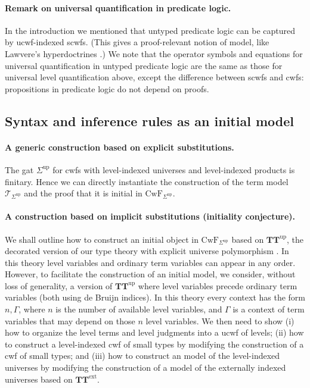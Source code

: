 \documentclass[11pt,a4paper]{article}
\theoremstyle{plain}
\theoremstyle{definition}
\newcommand{\T}{\mathsf{T}}
\def\T{\mathcal{T}}
\def\CwF{\mathrm{CwF}}
\def\Sigmaint{{\Sigma^\mathrm{up}}}
\def\TText{{\mathbf{TT}^\mathrm{ext}}}
\def\TTint{{\mathbf{TT}^\mathrm{up}}}
\begin{document}
\paragraph{Remark on universal quantification in predicate logic.} 

In the introduction we mentioned that untyped predicate logic can be captured by ucwf-indexed scwfs. (This gives a proof-relevant notion of model, like Lawvere's hyperdoctrines \cite{lawvere:hyperdoctrines}.) We note that the operator symbols and equations for universal quantification in untyped predicate logic are the same as those for universal level quantification above, except the difference between scwfs and cwfs: propositions in predicate logic do not depend on proofs.

\subsection{Syntax and inference rules as an initial model}\label{initiality-internal}

\paragraph{A generic construction based on explicit substitutions.} The gat $\Sigmaint$ for cwfs with level-indexed universes and level-indexed products is finitary. Hence we can directly instantiate the construction of the term model $\T_{\Sigmaint}$ \cite{bezem:hofmann} and the proof that it is initial in $\CwF_{\Sigmaint}$.

\paragraph{A construction based on implicit substitutions (initiality conjecture).} We shall outline how to construct an initial object in $\CwF_{\Sigmaint}$ based on $\TTint$, the decorated version of our type theory with explicit universe polymorphism \cite{BezemCDE22}. In this theory level variables and ordinary term variables can appear in any order. However, to facilitate the construction of an initial model, we consider, without loss of generality, a version of $\TTint$ where level variables precede ordinary term variables (both using de Bruijn indices). In this theory every context has the form $n,\Gamma$, where $n$ is the number of available level variables, and $\Gamma$ is a context of term variables that may depend on those $n$ level variables. We then need to show (i) how to organize the level terms and level judgments into a ucwf of levels; (ii) how to construct a level-indexed cwf of small types by modifying the construction of a cwf of small types; and (iii) how to construct an model of the level-indexed universes by modifying the construction of a model of the externally indexed universes based on $\TText$.
\end{document}
